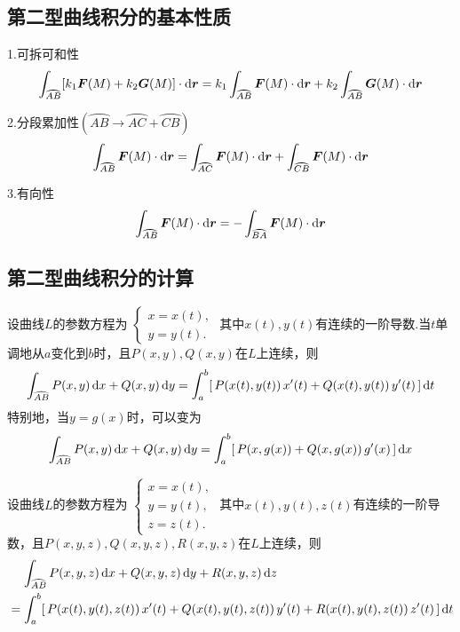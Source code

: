 \subsection{第二型曲线积分的基本性质}
\ttheorem[第二型曲线积分的三个基本性质]
1.可拆可和性
\begin{equation}
	\int_{\wideparen{AB}}[k_1\bm{F}(M)+k_2\bm{G}(M)] \cdot \d \bm{r} = k_1\int_{\wideparen{AB}}\bm{F}(M) \cdot \d \bm{r} +k_2 \int_{\wideparen{AB}}\bm{G}(M) \cdot \d \bm{r} 
\end{equation}

2.分段累加性$\left( \wideparen{AB} \rightarrow \wideparen{AC} + \wideparen{CB}\right) $
\begin{equation}
	\int_{\wideparen{AB}}\bm{F}(M) \cdot \d \bm{r} = \int_{\wideparen{AC}}\bm{F}(M) \cdot \d \bm{r} +\int_{\wideparen{CB}}\bm{F}(M) \cdot \d \bm{r}
\end{equation}

3.有向性
\begin{equation}
	\int_{\wideparen{AB}}\bm{F}(M) \cdot \d \bm{r} = -\int_{\wideparen{BA}}\bm{F}(M) \cdot \d \bm{r}
\end{equation}

\subsection{第二型曲线积分的计算}
\ttheorem[平面曲线下第二型曲线积分的计算]
设曲线$L$的参数方程为
$
\begin{cases}
	x = x(t),\\
	y = y(t).
\end{cases}
$
其中$x(t),y(t)$有连续的一阶导数.当$t$单调地从$a$变化到$b$时，且$P(x,y),Q(x,y)$在$L$上连续，则
\begin{equation}
	\int_{\wideparen{AB}}P(x,y)\,\d x+Q(x,y)\,\d y = \int_{a}^{b}[\,P(x(t),y(t))\,x'(t) + Q(x(t),y(t))\,y'(t) \,]\,\d t
\end{equation}
特别地，当$y=g(x)$时，可以变为
\begin{equation}
	\int_{\wideparen{AB}}P(x,y)\,\d x+Q(x,y)\,\d y = \int_{a}^{b}[\,P(x,g(x)) + Q(x,g(x))\,g'(x) \,]\,\d x
\end{equation}

\ttheorem[空间曲线下第二型曲线积分的计算]
设曲线$L$的参数方程为
$
\begin{cases}
	x = x(t),\\
	y = y(t),\\
	z =z(t).
\end{cases}
$
其中$x(t),y(t),z(t)$有连续的一阶导数，且$P(x,y,z),Q(x,y,z),R(x,y,z)$在$L$上连续，则
\begin{equation}
	\begin{split}
		&\quad \,\int_{\wideparen{AB}}P(x,y,z)\,\d x+Q(x,y,z)\,\d y +R(x,y,z)\, \d z\\
		&= \int_{a}^{b}[\,P(x(t),y(t),z(t))\,x'(t) + Q(x(t),y(t),z(t))\,y'(t) + R(x(t),y(t),z(t))\,z'(t) \,]\,\d t
	\end{split}
\end{equation}

